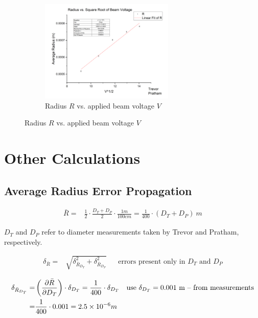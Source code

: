 \documentclass[12pt]{article}
\begin{document}
\begin{figure} [h]
    \begin{subfigure}
        \centering
        \includegraphics[width=0.7\textwidth]{figures/EOM_Fix_Amps.png}
        \caption{Radius $R$ vs. applied beam voltage $V$}
        \label{f:FixA}
    \end{subfigure}
\end{figure}

\clearpage

\section{Other Calculations} \label{sec:ERROR}
\subsection{Average Radius Error Propagation} \label{sec:RadiusErr}

\begin{align}
	\bar{R} =& \frac{1}{2}\cdot\frac{D_T + D_P}{2}\cdot\frac{1 m}{100 cm} = \frac{1}{400}\cdot(D_T + D_P)\ m \label{e:R_calculation} 	
\end{align}

$D_T$ and $D_P$ refer to diameter measurements taken by Trevor and Pratham, respectively.

\begin{align}
	\delta_{\bar{R}} =& \sqrt{\delta_{\bar{R}_{D_T}}^2 + \delta_{\bar{R}_{D_P}}^2} && \text{errors present only in }D_T \text{ and }D_P \label{e:R_bar_err_exp}
\end{align}

\begin{align}
	\delta_{\bar{R}_{D_T}} =& \left( \frac{\partial \bar{R}}{\partial D_T} \right)\cdot\delta_{D_T} = \frac{1}{400}\cdot\delta_{D_T} && \text{use }\delta_{D_T}=0.001\text{ m -- from measurements} \label{e:R_err_Dt} \\
	=& \frac{1}{400}\cdot0.001=2.5\times10^{-6} m \notag
\end{align}
\end{document}
